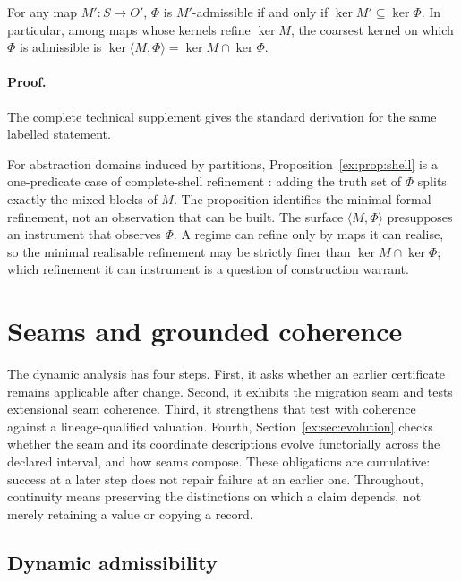 \documentclass[twocolumn,envcountsect,envcountsame,natbib]{svjour3}
\begin{document}
\begin{proposition}\label{ex:prop:shell}
For any map $M':S\to O'$, $\Phi$ is $M'$-admissible if and only if $\ker M' \subseteq \ker \Phi$. In particular, among maps whose kernels refine $\ker M$, the coarsest kernel on which $\Phi$ is admissible is $\ker \langle M,\Phi \rangle=\ker M \cap \ker \Phi$.
\end{proposition}

\paragraph{Proof.} The complete technical supplement gives the standard derivation for the same labelled statement.

For abstraction domains induced by partitions, Proposition~\ref{ex:prop:shell} is a one-predicate case of complete-shell refinement \citep{giacobazziranzatoscozzari2000,ranzatotapparo2004}: adding the truth set of $\Phi$ splits exactly the mixed blocks of $M$. The proposition identifies the minimal formal refinement, not an observation that can be built. The surface $\langle M,\Phi \rangle$ presupposes an instrument that observes $\Phi$. A regime can refine only by maps it can realise, so the minimal realisable refinement may be strictly finer than $\ker M\cap\ker\Phi$; which refinement it can instrument is a question of construction warrant.


\section{Seams and grounded coherence}\label{ex:sec:seams}\label{ch:change}

The dynamic analysis has four steps. First, it asks whether an earlier certificate remains applicable after change. Second, it exhibits the migration seam and tests extensional seam coherence. Third, it strengthens that test with coherence against a lineage-qualified valuation. Fourth, Section~\ref{ex:sec:evolution} checks whether the seam and its coordinate descriptions evolve functorially across the declared interval, and how seams compose. These obligations are cumulative: success at a later step does not repair failure at an earlier one. Throughout, continuity means preserving the distinctions on which a claim depends, not merely retaining a value or copying a record.

\subsection{Dynamic admissibility}\label{ex:sec:dynamic}
\end{document}
